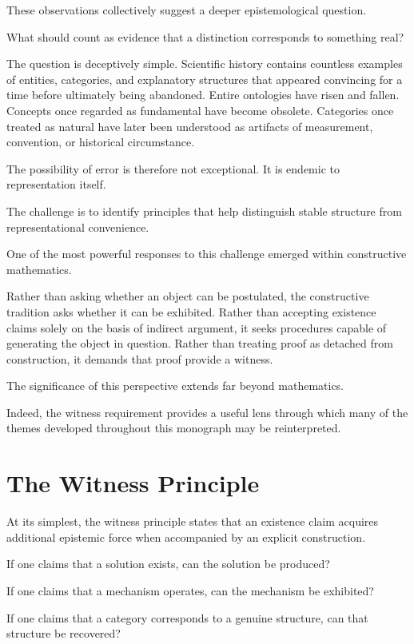 \documentclass[11pt,oneside,openany]{book}
\begin{document}
These observations collectively suggest a deeper epistemological question.

What should count as evidence that a distinction corresponds to something real?

The question is deceptively simple. Scientific history contains countless examples of entities, categories, and explanatory structures that appeared convincing for a time before ultimately being abandoned. Entire ontologies have risen and fallen. Concepts once regarded as fundamental have become obsolete. Categories once treated as natural have later been understood as artifacts of measurement, convention, or historical circumstance.

The possibility of error is therefore not exceptional. It is endemic to representation itself.

The challenge is to identify principles that help distinguish stable structure from representational convenience.

One of the most powerful responses to this challenge emerged within constructive mathematics.

Rather than asking whether an object can be postulated, the constructive tradition asks whether it can be exhibited. Rather than accepting existence claims solely on the basis of indirect argument, it seeks procedures capable of generating the object in question. Rather than treating proof as detached from construction, it demands that proof provide a witness.

The significance of this perspective extends far beyond mathematics.

Indeed, the witness requirement provides a useful lens through which many of the themes developed throughout this monograph may be reinterpreted.

\section{The Witness Principle}

At its simplest, the witness principle states that an existence claim acquires additional epistemic force when accompanied by an explicit construction.

If one claims that a solution exists, can the solution be produced?

If one claims that a mechanism operates, can the mechanism be exhibited?

If one claims that a category corresponds to a genuine structure, can that structure be recovered?
\end{document}
